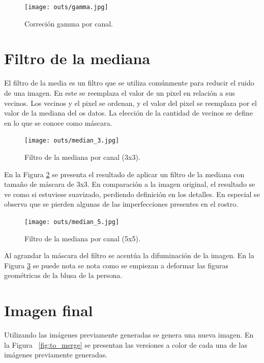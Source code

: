 \documentclass[letterpaper,9pt,journal,final]{IEEEtran}
\begin{document}
\begin{figure}[h!]
\hypertarget{fig:canales_gamma}{%
\centering
\texttt{[image: outs/gamma.jpg]}
\caption{Correción gamma por canal.}\label{fig:canales_gamma}
}
\end{figure}

\hypertarget{filtro-de-la-mediana}{%
\section{Filtro de la mediana}\label{filtro-de-la-mediana}}

El filtro de la media es un filtro que se utiliza comúnmente para
reducir el ruido de una imagen. En este se reemplaza el valor de un
pixel en relación a sus vecinos. Los vecinos y el pixel se ordenan, y el
valor del pixel se reemplaza por el valor de la mediana del os datos. La
elección de la cantidad de vecinos se define en lo que se conoce como
máscara.

\begin{figure}[h!]
\hypertarget{fig:median_3}{%
\centering
\texttt{[image: outs/median\_3.jpg]}
\caption{Filtro de la mediana por canal (3x3).}\label{fig:median_3}
}
\end{figure}

En la Figura \ref{fig:median_3} se presenta el resultado de aplicar un filtro
de la mediana con tamaño de máscara de 3x3. En comparación a la imagen
original, el resultado se ve como si estuviese suavizado, perdiendo
definición en los detalles. En especial se observa que se pierden
algunas de las imperfecciones presentes en el rostro.

\begin{figure}[h!]
\hypertarget{fig:median_5}{%
\centering
\texttt{[image: outs/median\_5.jpg]}
\caption{Filtro de la mediana por canal (5x5).}\label{fig:median_5}
}
\end{figure}

Al agrandar la máscara del filtro se acentúa la difuminación de la
imagen. En la Figura \ref{fig:median_5} se puede nota se nota como se
empiezan a deformar las figuras geométricas de la blusa de la persona.

\hypertarget{imagen-final}{%
\section{Imagen final}\label{imagen-final}}

Utilizando las imágenes previamente generadas se genera una nueva imagen. En
la Figura ~\ref{fig:to_merge} se presentan las versiones a color de cada una
de las imágenes previamente generadas.
\end{document}
